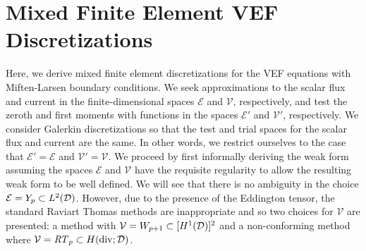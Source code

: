 \documentclass[../doc.tex]{subfiles}
\begin{document}
\chapter{Mixed Finite Element VEF Discretizations} \label{chap:rtvef}
Here, we derive mixed finite element discretizations for the VEF equations with Miften-Larsen boundary conditions. We seek approximations to the scalar flux and current in the finite-dimensional spaces $\mathcal{E}$ and $\mathcal{V}$, respectively, and test the zeroth and first moments with functions in the spaces $\mathcal{E}'$ and $\mathcal{V}'$, respectively. We consider Galerkin discretizations so that the test and trial spaces for the scalar flux and current are the same. In other words, we restrict ourselves to the case that $\mathcal{E}' = \mathcal{E}$ and $\mathcal{V}' = \mathcal{V}$. We proceed by first informally deriving the weak form assuming the spaces $\mathcal{E}$ and $\mathcal{V}$ have the requisite regularity to allow the resulting weak form to be well defined. We will see that there is no ambiguity in the choice $\mathcal{E} = Y_p \subset L^2(\mathcal{D})$. However, due to the presence of the Eddington tensor, the standard Raviart Thomas methods are inappropriate and so two choices for $\mathcal{V}$ are presented: a method with $\mathcal{V} = W_{p+1} \subset [H^1(\mathcal{D})]^2$ and a non-conforming method where $\mathcal{V} = \mathit{RT}_p\subset H(\operatorname{div};\mathcal{D})$. 
\end{document}
